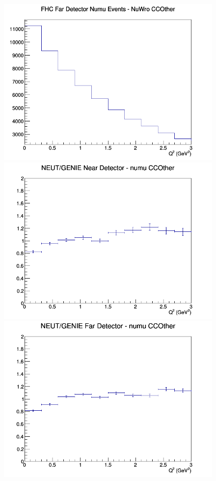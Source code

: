 \documentclass[12pt]{article}
\begin{document}
\begin{figure}[h]
\endminipage
{}
\includegraphics[width=\linewidth]{eff_Q2/FGT/CCOther_FHC_FD_numu_Q2_NuWro.png}
\endminipage
\newline
{}
\includegraphics[width=\linewidth]{eff_Q2/FGT/ratios/CCOther_NEUT_GENIE_numu_near_Q2.png}
\endminipage
{}
\includegraphics[width=\linewidth]{eff_Q2/FGT/ratios/CCOther_NEUT_GENIE_numu_far_Q2.png}

\end{figure}
\end{document}
